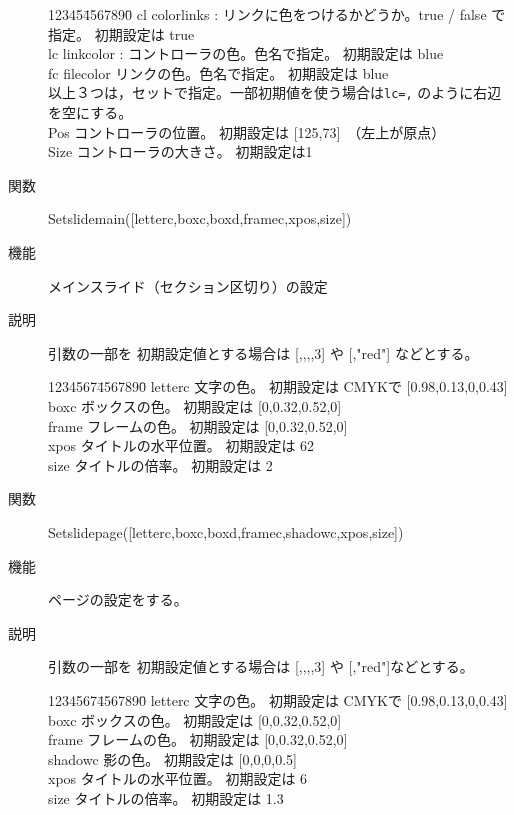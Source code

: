 \documentclass[papersize,a4paper,12pt,uplatex]{jsarticle}
\begin{document}
\begin{description}
\begin{tabbing}
12345\=4567890\=\kill
cl \> colorlinks : リンクに色をつけるかどうか。true / false で指定。 初期設定は true\\
lc \> linkcolor : コントローラの色。色名で指定。 初期設定は blue\\
fc\> filecolor リンクの色。色名で指定。 初期設定は blue\\
以上３つは，セットで指定。一部初期値を使う場合は\verb|lc=,| のように右辺を空にする。\\
Pos \> コントローラの位置。 初期設定は [125,73]　（左上が原点）\\
Size \> コントローラの大きさ。 初期設定は1
\end{tabbing}


\vspace{\baselineskip}
\hypertarget{setslidemain}{}
\item[関数]  Setslidemain([letterc,boxc,boxd,framec,xpos,size])
\item[機能]  メインスライド（セクション区切り）の設定
\item[説明]  引数の一部を 初期設定値とする場合は [,,,,3] や [,"red"] などとする。
\begin{tabbing}
1234567\=4567890\=\kill
letterc \> 文字の色。 初期設定は CMYKで [0.98,0.13,0,0.43]\\
boxc \> ボックスの色。 初期設定は [0,0.32,0.52,0] \\
frame\> フレームの色。 初期設定は [0,0.32,0.52,0]\\
xpos \> タイトルの水平位置。 初期設定は 62\\
size \> タイトルの倍率。 初期設定は 2
\end{tabbing}


\vspace{\baselineskip}
\hypertarget{setslidepage}{}
\item[関数]  Setslidepage([letterc,boxc,boxd,framec,shadowc,xpos,size])
\item[機能]  ページの設定をする。
\item[説明]  引数の一部を 初期設定値とする場合は [,,,,3] や [,"red"]などとする。

\begin{tabbing}
1234567\=4567890\=\kill
letterc \> 文字の色。 初期設定は CMYKで [0.98,0.13,0,0.43]\\
boxc \> ボックスの色。 初期設定は [0,0.32,0.52,0] \\
frame\> フレームの色。 初期設定は [0,0.32,0.52,0]\\
shadowc \> 影の色。 初期設定は [0,0,0,0.5]\\
xpos \> タイトルの水平位置。 初期設定は 6\\
size \> タイトルの倍率。 初期設定は 1.3
\end{tabbing}


\end{description}
\end{document}
